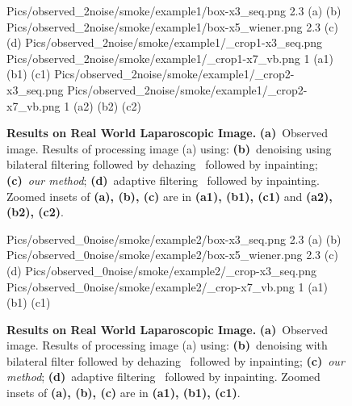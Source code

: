 \begin{figure}[!t]
     {Pics/observed_2noise/smoke/example1/box-x3_seq.png} {2.3} {(a)} {(b)}
     {Pics/observed_2noise/smoke/example1/box-x5_wiener.png} {2.3} {(c)} {(d)}
     {Pics/observed_2noise/smoke/example1/_crop1-x3_seq.png} {Pics/observed_2noise/smoke/example1/_crop1-x7_vb.png} {1} {(a1)} {(b1)} {(c1)}
     {Pics/observed_2noise/smoke/example1/_crop2-x3_seq.png} {Pics/observed_2noise/smoke/example1/_crop2-x7_vb.png} {1} {(a2)} {(b2)} {(c2)}
    \caption
    {
        {\bf Results on Real World Laparoscopic Image.}
        {\bf (a)}~Observed image.
        Results of processing image (a) using:
        {\bf (b)}~denoising using bilateral filtering followed by dehazing~\cite{he2011dark} followed by inpainting;
        {\bf (c)}~{\em our method};
        {\bf (d)}~adaptive filtering~\cite{gibson2013wiener} followed by inpainting.
        Zoomed insets of {\bf (a), (b), (c)} are in {\bf (a1), (b1), (c1)} and {\bf (a2), (b2), (c2)}.
    }
    \label{fig:resultsObs1}
\end{figure}

\begin{figure}[!t]
     {Pics/observed_0noise/smoke/example2/box-x3_seq.png} {2.3} {(a)} {(b)}
     {Pics/observed_0noise/smoke/example2/box-x5_wiener.png} {2.3} {(c)} {(d)}
     {Pics/observed_0noise/smoke/example2/_crop-x3_seq.png} {Pics/observed_0noise/smoke/example2/_crop-x7_vb.png} {1} {(a1)} {(b1)} {(c1)}
    \caption
    {
        {\bf Results on Real World Laparoscopic Image.}
        {\bf (a)}~Observed image.
        Results of processing image (a) using:
        {\bf (b)}~denoising with bilateral filter followed by dehazing~\cite{he2011dark} followed by inpainting;
        {\bf (c)}~{\em our method};
        {\bf (d)}~adaptive filtering~\cite{gibson2013wiener} followed by inpainting.
        Zoomed insets of {\bf (a), (b), (c)} are in {\bf (a1), (b1), (c1)}.
    }
    \label{fig:resultsObs2}
\end{figure}

